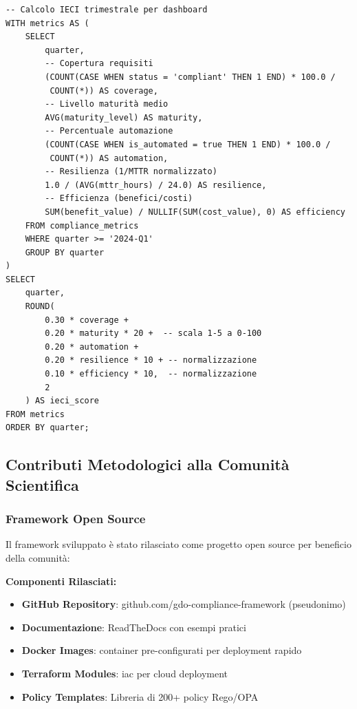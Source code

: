 \begin{lstlisting}[caption={Query SQL per Calcolo IECI},label={lst:ieci_sql}]
-- Calcolo IECI trimestrale per dashboard
WITH metrics AS (
    SELECT 
        quarter,
        -- Copertura requisiti
        (COUNT(CASE WHEN status = 'compliant' THEN 1 END) * 100.0 / 
         COUNT(*)) AS coverage,
        -- Livello maturità medio
        AVG(maturity_level) AS maturity,
        -- Percentuale automazione
        (COUNT(CASE WHEN is_automated = true THEN 1 END) * 100.0 / 
         COUNT(*)) AS automation,
        -- Resilienza (1/MTTR normalizzato)
        1.0 / (AVG(mttr_hours) / 24.0) AS resilience,
        -- Efficienza (benefici/costi)
        SUM(benefit_value) / NULLIF(SUM(cost_value), 0) AS efficiency
    FROM compliance_metrics
    WHERE quarter >= '2024-Q1'
    GROUP BY quarter
)
SELECT 
    quarter,
    ROUND(
        0.30 * coverage + 
        0.20 * maturity * 20 +  -- scala 1-5 a 0-100
        0.20 * automation + 
        0.20 * resilience * 10 + -- normalizzazione
        0.10 * efficiency * 10,  -- normalizzazione
        2
    ) AS ieci_score
FROM metrics
ORDER BY quarter;
\end{lstlisting}

\subsection{\texorpdfstring{Contributi Metodologici alla Comunità Scientifica}{4.7.3 - Contributi Metodologici alla Comunità Scientifica}}

\subsubsection{\texorpdfstring{Framework Open Source}{4.7.3.1 - Framework Open Source}}

Il framework sviluppato è stato rilasciato come progetto open source per beneficio della comunità:

\textbf{Componenti Rilasciati:}
\begin{itemize}
    \item \textbf{GitHub Repository}: github.com/gdo-compliance-framework (pseudonimo)
    \item \textbf{Documentazione}: ReadTheDocs con esempi pratici
    \item \textbf{Docker Images}: \gls{container} pre-configurati per deployment rapido
    \item \textbf{Terraform Modules}: \gls{iac} per cloud deployment
    \item \textbf{Policy Templates}: Libreria di 200+ policy Rego/OPA
\end{itemize}

